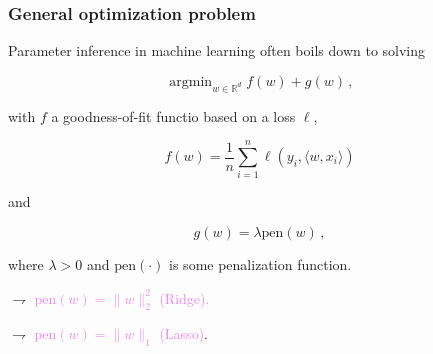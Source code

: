 \documentclass[9pt]{beamer}
\DeclareMathOperator*{\argmin}{argmin}%
\DeclareMathOperator{\pen}{pen}
\newcommand\R{\mathds{R}}
\renewcommand\pen{\textrm{pen}}
\begin{document}
\begin{frame}
	\frametitle{General optimization problem}
	
\alert{Parameter inference in machine learning} often boils down to solving

\begin{equation*}
\argmin_{w \in \R^d} f(w) + g(w)\,,
\end{equation*}

with $f$ a \alert{goodness-of-fit functio  based on a loss $\ell$},

\begin{equation*}
f(w) = \frac 1n \sum_{i=1}^n \ell(y_i, \langle w, x_i \rangle)
\end{equation*}

 and

\begin{equation*}
g(w) = \lambda \pen(w)\,,
\end{equation*}

where $\lambda>0$ and \alert{$\pen(\cdot)$ is some penalization function}.


$\rightharpoondown$ \textcolor{violet}{$\pen(w) =  \|w\|_2^2$ (Ridge).}

$\rightharpoondown$ \textcolor{violet}{$\pen(w) = \|w\|_1$ (Lasso)}.


\end{frame}




%
%
%
%
%
%
%
%
%
%
\end{document}
